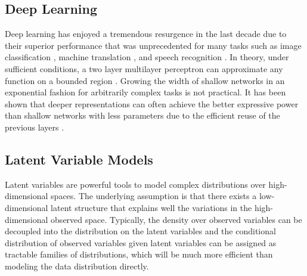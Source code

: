 \documentclass{scrartcl}
\theoremstyle{definition}
\begin{document}
\subsection{Deep Learning}
\label{sec:bckgrnd:deep-learning}
Deep learning has enjoyed a tremendous resurgence in the last decade due to their superior performance that was unprecedented for many tasks such as image classification \parencite{krizhevsky2012imagenet}, machine translation \parencite{bahdanau2014neural}, 
and speech recognition \parencite{amodei2016deep}. In theory, under sufficient conditions, a two layer multilayer perceptron can approximate any function on a bounded region \parencite{cybenko1989approximation,Hornik1991-li}. Growing the width of shallow networks in an exponential fashion for arbitrarily complex tasks is not practical. It has been shown that deeper representations can often achieve the better expressive power than shallow networks with less parameters due to the efficient reuse of the previous layers  \parencite{eldan2016power}.


\subsection{Latent Variable Models}
\label{sec:bckgrnd:lvms}
Latent variables are powerful tools to model complex distributions over high-dimensional spaces.
The underlying assumption is that there exists a low-dimensional latent structure that explains well the variations in the high-dimensional observed space. Typically,  the density over observed variables can be decoupled into the distribution on the latent variables and the conditional distribution of observed variables given latent variables can be assigned as tractable families of distributions, which will be much more efficient than modeling the data distribution directly. 
\end{document}
